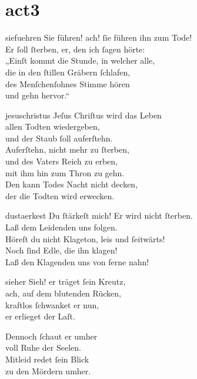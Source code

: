\documentclass[abbrwidth=6em,tocstyle=ref-genre,toe=false]{ees}
\begin{document}
{\part{act3}

\begin{movement}{siefuehren}
  \voice[Blindgebohrner]
  Sie führen! ach! ſie führen ihn zum Tode!\\
  Er ſoll ſterben, er, den ich ſagen hörte:\\
  „Einſt kommt die Stunde, in welcher alle,\\
  die in den ſtillen Gräbern ſchlafen,\\
  des Menſchenſohnes Stimme hören\\
  und gehn hervor.“
\end{movement}

\begin{movement}{jesuschristus}
  \voice[Blindgebohrner]
  Jeſus Chriſtus wird das Leben\\
  allen Todten wiedergeben,\\
  und der Staub ſoll auferſtehn.\\
  Auferſtehn, nicht mehr zu ſterben,\\
  und des Vaters Reich zu erben,\\
  mit ihm hin zum Thron zu gehn.\\
  Den kann Todes Nacht nicht decken,\\
  der die Todten wird erwecken.
\end{movement}

\begin{movement}{dustaerkest}
  \voice[Fremdling]
  Du ſtärkeſt mich! Er wird nicht ſterben.\\
  Laß dem Leidenden uns folgen.\\
  Höreſt du nicht Klageton, leis und ſeitwärts!\\
  Noch ſind Edle, die ihn klagen!\\
  Laß den Klagenden uns von ferne nahn!
\end{movement}

\begin{movement}{sieher}
  \voice[Joseph]
  Sieh! er träget ſein Kreutz,\\
  ach, auf dem blutenden Rücken,\\
  kraftlos ſchwanket er nun,\\
  er erlieget der Laſt.

  \voice[Nikodemus]
  Dennoch ſchaut er umher\\
  voll Ruhe der Seelen.\\
  Mitleid redet ſein Blick\\
  zu den Mördern umher.


\end{movement}}
\end{document}
